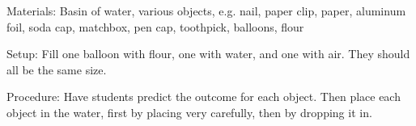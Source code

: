 \begin{multicols}{2}

\begin{description*}
\item[Materials:]{Basin of water, various objects, e.g. nail, paper clip, paper, aluminum foil, soda cap, matchbox, pen cap, toothpick, balloons, flour}
\item[Setup:]{Fill one balloon with flour, one with water, and one with air. They should all be the same size.}
\item[Procedure:]{Have students predict the outcome for each object. Then place each object in the water, first by placing very carefully, then by dropping it in.}
\end{description*}


\end{multicols}
